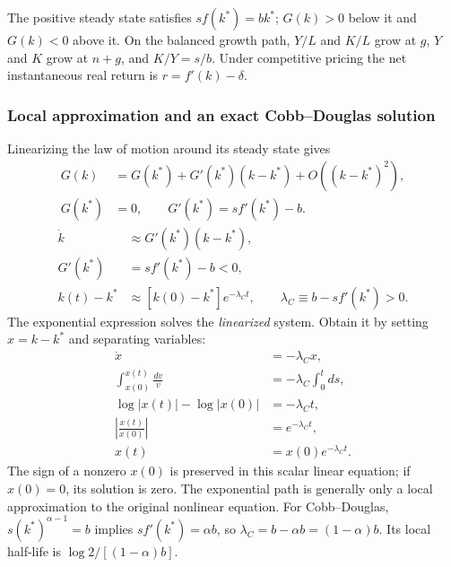The positive steady state satisfies $sf(k^*)=bk^*$; $G(k)>0$ below it and
$G(k)<0$ above it. On the balanced growth path, $Y/L$ and $K/L$ grow at $g$,
$Y$ and $K$ grow at $n+g$, and $K/Y=s/b$. Under competitive pricing the net
instantaneous real return is $r=f'(k)-\delta$.

\subsubsection{Local approximation and an exact Cobb--Douglas solution}

Linearizing the law of motion around its steady state gives
\begin{align}
G(k)&=G(k^*)+G'(k^*)(k-k^*)+O((k-k^*)^2),\\
G(k^*)&=0,\qquad G'(k^*)=sf'(k^*)-b.
\end{align}
\begin{align}
\dot k&\approx G'(k^*)(k-k^*),\\
G'(k^*)&=sf'(k^*)-b<0,\\
k(t)-k^*&\approx[k(0)-k^*]e^{-\lambda_Ct},
\qquad \lambda_C\equiv b-sf'(k^*)>0.\label{eq:solow-continuous-speed}
\end{align}
The exponential expression solves the \emph{linearized} system. Obtain it
by setting $x=k-k^*$ and separating variables:
\begin{align}
\dot x&=-\lambda_Cx,\\
\int_{x(0)}^{x(t)}\frac{dv}{v}&=-\lambda_C\int_0^t ds,\\
\log|x(t)|-\log|x(0)|&=-\lambda_Ct,\\
\left|\frac{x(t)}{x(0)}\right|&=e^{-\lambda_Ct},\\
x(t)&=x(0)e^{-\lambda_Ct}.
\end{align}
The sign of a nonzero $x(0)$ is preserved in this scalar linear equation;
if $x(0)=0$, its solution is zero. The exponential path is generally
only a local approximation to the original nonlinear equation. For
Cobb--Douglas, $s(k^*)^{\alpha-1}=b$ implies
$sf'(k^*)=\alpha b$, so $\lambda_C=b-\alpha b=(1-\alpha)b$.
Its local half-life is
$\log2/[(1-\alpha)b]$.

